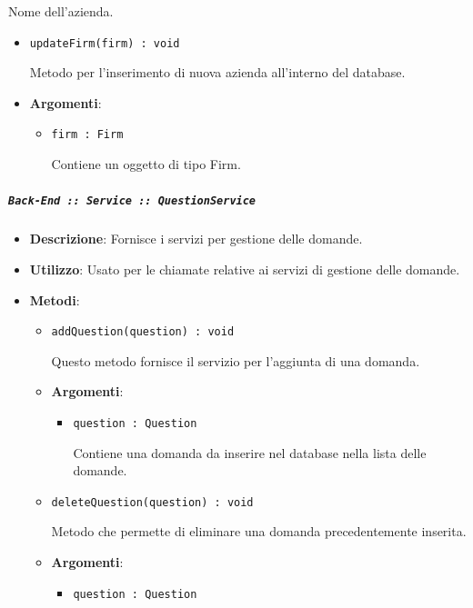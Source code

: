 \documentclass[../DefinizioneDiProdotto.tex]{subfiles}
\begin{document}
\begin{itemize}
\begin{itemize}
\begin{itemize}
\begin{itemize}
	 Nome dell'azienda.
	\end{itemize}
	\end{itemize}\vspace{0.5em}
	\begin{itemize}
	\item \texttt{updateFirm(firm) : void}\

	 Metodo per l'inserimento di nuova azienda all'interno del database.

	\item \textbf{Argomenti}:
	\begin{itemize}
	\item \texttt{firm : Firm}\

	 Contiene un oggetto di tipo Firm.
	\end{itemize}
	\end{itemize}\vspace{0.5em}
	\end{itemize}\subparagraph{\texttt{Back-End :: Service :: QuestionService}}
	\begin{itemize}\item \textbf{Descrizione}: Fornisce i servizi per gestione delle domande.
	\item \textbf{Utilizzo}: Usato per le chiamate relative ai servizi di gestione delle domande.
	\item \textbf{Metodi}:
	\begin{itemize}
	\item \texttt{addQuestion(question) : void}\

	 Questo metodo fornisce il servizio per l'aggiunta di una domanda.

	\item \textbf{Argomenti}:
	\begin{itemize}
	\item \texttt{question : Question}\

	 Contiene una domanda da inserire nel database nella lista delle domande.
	\end{itemize}
	\end{itemize}\vspace{0.5em}
	\begin{itemize}
	\item \texttt{deleteQuestion(question) : void}\

	 Metodo che permette di eliminare una domanda precedentemente inserita.

	\item \textbf{Argomenti}:
	\begin{itemize}
	\item \texttt{question : Question}\


\end{itemize}
\end{itemize}
\end{itemize}
\end{itemize}
\end{document}
